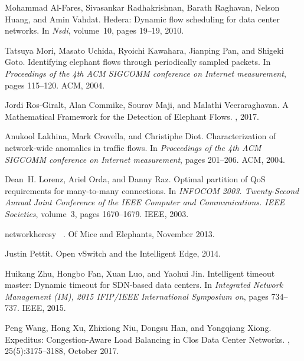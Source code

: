 \begin{thebibliography}{100}
 Mohammad Al-Fares, Sivasankar Radhakrishnan, Barath Raghavan, Nelson Huang, and
  Amin Vahdat.
\newblock Hedera: {Dynamic} flow scheduling for data center networks.
\newblock In {\em Nsdi}, volume~10, pages 19--19, 2010.

 Tatsuya Mori, Masato Uchida, Ryoichi Kawahara, Jianping Pan, and Shigeki Goto.
\newblock Identifying elephant flows through periodically sampled packets.
\newblock In {\em Proceedings of the 4th {ACM} {SIGCOMM} conference on
  {Internet} measurement}, pages 115--120. ACM, 2004.

 Jordi Ros-Giralt, Alan Commike, Sourav Maji, and Malathi Veeraraghavan.
\newblock A {Mathematical} {Framework} for the {Detection} of {Elephant}
  {Flows}.
, 2017.

 Anukool Lakhina, Mark Crovella, and Christiphe Diot.
\newblock Characterization of network-wide anomalies in traffic flows.
\newblock In {\em Proceedings of the 4th {ACM} {SIGCOMM} conference on
  {Internet} measurement}, pages 201--206. ACM, 2004.

 Dean~H. Lorenz, Ariel Orda, and Danny Raz.
\newblock Optimal partition of {QoS} requirements for many-to-many connections.
\newblock In {\em {INFOCOM} 2003. {Twenty}-{Second} {Annual} {Joint}
  {Conference} of the {IEEE} {Computer} and {Communications}. {IEEE}
  {Societies}}, volume~3, pages 1670--1679. IEEE, 2003.

 networkheresy ~.
\newblock Of {Mice} and {Elephants}, November 2013.

 Justin Pettit.
\newblock Open {vSwitch} and the {Intelligent} {Edge}, 2014.

 Huikang Zhu, Hongbo Fan, Xuan Luo, and Yaohui Jin.
\newblock Intelligent timeout master: {Dynamic} timeout for {SDN}-based data
  centers.
\newblock In {\em Integrated {Network} {Management} ({IM}), 2015 {IFIP}/{IEEE}
  {International} {Symposium} on}, pages 734--737. IEEE, 2015.

 Peng Wang, Hong Xu, Zhixiong Niu, Dongsu Han, and Yongqiang Xiong.
\newblock Expeditus: {Congestion}-{Aware} {Load} {Balancing} in {Clos} {Data}
  {Center} {Networks}.
, 25(5):3175--3188, October
  2017.


\end{thebibliography}
